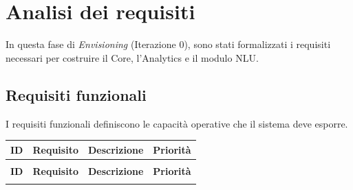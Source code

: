 \section{Analisi dei requisiti}

In questa fase di \textit{Envisioning} (Iterazione 0), sono stati formalizzati i requisiti necessari per costruire il Core, l'Analytics e il modulo NLU.

\subsection{Requisiti funzionali}

I requisiti funzionali definiscono le capacità operative che il sistema deve esporre.

\begin{small}
    \begin{longtable}{|c|p{4cm}|p{6cm}|c|}

        \hline
        \textbf{ID} & \textbf{Requisito}              & \textbf{Descrizione}                                                                                                                                                                            & \textbf{Priorità} \\ \hline
        \endfirsthead

        \multicolumn{4}{c}{{}}                                                                                                                                                                                                                                              \\
        \hline
        \textbf{ID} & \textbf{Requisito}              & \textbf{Descrizione}                                                                                                                                                                            & \textbf{Priorità} \\ \hline
        \endhead

        \hline
        \endfoot


\end{longtable}
\end{small}
